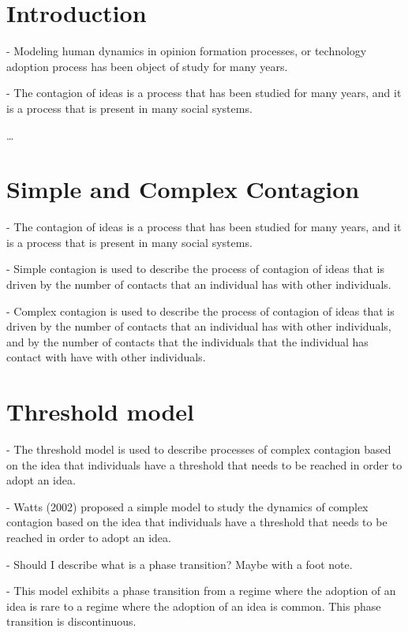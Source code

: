 \section{\label{sec:Introduction} Introduction}

- Modeling human dynamics in opinion formation processes, or technology adoption process has been object of study for many years. 

- The contagion of ideas is a process that has been studied for many years, and it is a process that is present in many social systems.

\dots

\section{\label{sec:Simple and Complex Contagion} Simple and Complex Contagion}

- The contagion of ideas is a process that has been studied for many years, and it is a process that is present in many social systems. 

- Simple contagion is used to describe the process of contagion of ideas that is driven by the number of contacts that an individual has with other individuals.

- Complex contagion is used to describe the process of contagion of ideas that is driven by the number of contacts that an individual has with other individuals, and by the number of contacts that the individuals that the individual has contact with have with other individuals.

\section{\label{sec:Threshold model} Threshold model}

- The threshold model is used to describe processes of complex contagion based on the idea that individuals have a threshold that needs to be reached in order to adopt an idea.

- Watts (2002) proposed a simple model to study the dynamics of complex contagion based on the idea that individuals have a threshold that needs to be reached in order to adopt an idea. 

- Should I describe what is a phase transition? Maybe with a foot note.

- This model exhibits a phase transition from a regime where the adoption of an idea is rare to a regime where the adoption of an idea is common. This phase transition is discontinuous.

